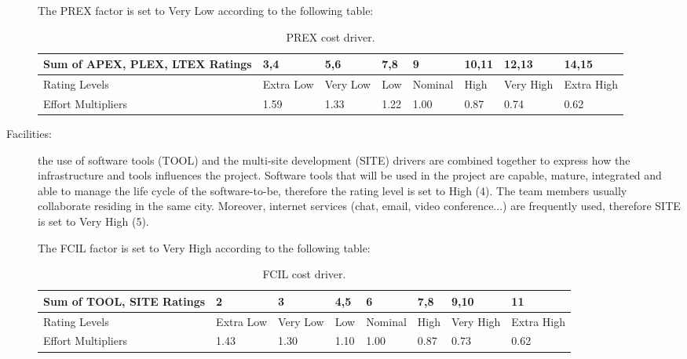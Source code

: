 \begin{description}
The PREX factor is set to Very Low according to the following table:

\begin{table}[H]
	\begin{adjustwidth}{-.5in}{-.5in}
    \centering
    \begin{tabular}{p{4cm}|p{1cm}|p{1cm}|p{1cm}|p{1.5cm}|p{1cm}|p{1cm}|p{1cm}}
        \hline
        Sum of APEX, PLEX, LTEX Ratings & 3,4 & 5,6 & 7,8 & 9 & 10,11 & 12,13 & 14,15 \\
        \hline
        \hline
        Rating Levels & Extra Low & Very Low & Low & Nominal & High & Very High & Extra High \\
        \hline
        Effort Multipliers & 1.59 & 1.33 & 1.22 & 1.00 & 0.87 & 0.74 & 0.62 \\
        \hline
    \end{tabular}
    \caption{PREX cost driver.}
    \end{adjustwidth}
\end{table}

\item[Facilities:] the use of software tools (TOOL) and the multi-site development (SITE) drivers are combined together to express how the infrastructure and tools influences the project. Software tools that will be used in the project are capable, mature, integrated and able to manage the life cycle of the software-to-be, therefore the rating level is set to High (4). The team members usually collaborate residing in the same city. Moreover, internet services (chat, email, video conference...) are frequently used, therefore SITE is set to Very High (5).

The FCIL factor is set to Very High according to the following table:

\begin{table}[H]
	\begin{adjustwidth}{-.5in}{-.5in}
    \centering
    \begin{tabular}{p{4cm}|p{1cm}|p{1cm}|p{1cm}|p{1.5cm}|p{1cm}|p{1cm}|p{1cm}}
        \hline
        Sum of TOOL, SITE Ratings & 2 & 3 & 4,5 & 6 & 7,8 & 9,10 & 11 \\
        \hline
        \hline
        Rating Levels & Extra Low & Very Low & Low & Nominal & High & Very High & Extra High \\
        \hline
        Effort Multipliers & 1.43 & 1.30 & 1.10 & 1.00 & 0.87 & 0.73 & 0.62 \\
        \hline
    \end{tabular}
    \caption{FCIL cost driver.}
    \end{adjustwidth}
\end{table}


\end{description}
